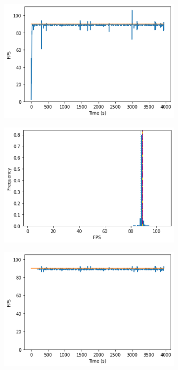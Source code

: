 \begin{figure}[t]
    \centering
    \begin{subfigure}{.45\textwidth}
        \centering
        \includegraphics[width=\textwidth]{pictures/analysis stream tracer 100/output_5_0.png}
        \caption{}
    \end{subfigure}
    \begin{subfigure}{.45\textwidth}
        \centering
        \includegraphics[width=\textwidth]{pictures/analysis stream tracer 100/output_6_0.png}
        \caption{}
    \end{subfigure}
    \begin{subfigure}{.45\textwidth}
        \centering
        \includegraphics[width=\textwidth]{pictures/analysis stream tracer 100/output_13_0.png}

\end{subfigure}
\end{figure}

